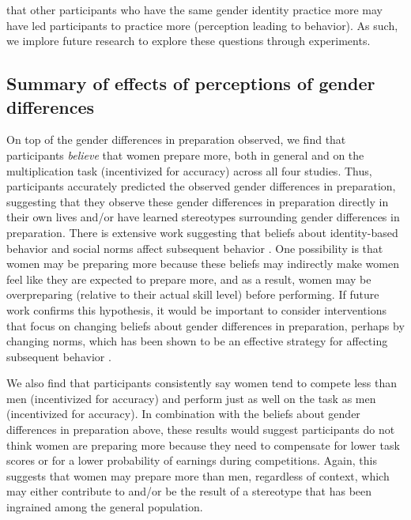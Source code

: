\documentclass[letterpaper, nobind]{templates/ociamthesis}
\begin{document}
that other participants who have the same gender identity practice more may have led participants to practice more (perception leading to behavior). As such, we implore future research to explore these questions through experiments.

\hypertarget{summary-of-effects-of-perceptions-of-gender-differences}{%
\subsection{Summary of effects of perceptions of gender differences}\label{summary-of-effects-of-perceptions-of-gender-differences}}

On top of the gender differences in preparation observed, we find that participants \emph{believe} that women prepare more, both in general and on the multiplication task (incentivized for accuracy) across all four studies. Thus, participants accurately predicted the observed gender differences in preparation, suggesting that they observe these gender differences in preparation directly in their own lives and/or have learned stereotypes surrounding gender differences in preparation. There is extensive work suggesting that beliefs about identity-based behavior and social norms affect subsequent behavior \autocite{Babcock2012,Bowles2007,Toosi2019,Smith2014,Benjamin2010c,Bertrand2015,Akerlof2000}. One possibility is that women may be preparing more because these beliefs may indirectly make women feel like they are expected to prepare more, and as a result, women may be overpreparing (relative to their actual skill level) before performing. If future work confirms this hypothesis, it would be important to consider interventions that focus on changing beliefs about gender differences in preparation, perhaps by changing norms, which has been shown to be an effective strategy for affecting subsequent behavior \autocite{Miller2016}.

We also find that participants consistently say women tend to compete less than men (incentivized for accuracy) and perform just as well on the task as men (incentivized for accuracy). In combination with the beliefs about gender differences in preparation above, these results would suggest participants do not think women are preparing more because they need to compensate for lower task scores or for a lower probability of earnings during competitions. Again, this suggests that women may prepare more than men, regardless of context, which may either contribute to and/or be the result of a stereotype that has been ingrained among the general population.
\end{document}
